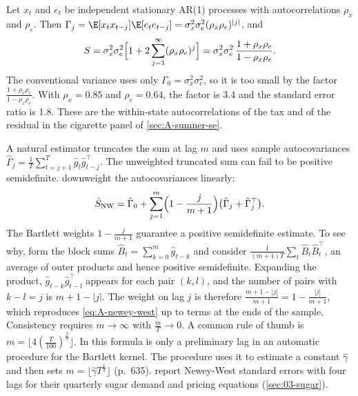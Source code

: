 \begin{example}\label{ex:A-ar1-factor}
Let $x_t$ and $e_t$ be independent stationary AR(1) processes with autocorrelations $\rho_x$ and $\rho_e$. Then
$\Gamma_j = \E[x_tx_{t-j}]\E[e_te_{t-j}] = \sigma_x^2\sigma_e^2(\rho_x\rho_e)^{|j|}$, and
\begin{equation*}
  S = \sigma_x^2\sigma_e^2\Bigl[1 + 2\sum_{j=1}^{\infty}(\rho_x\rho_e)^j\Bigr]
  = \sigma_x^2\sigma_e^2\,\frac{1 + \rho_x\rho_e}{1 - \rho_x\rho_e}.
\end{equation*}
The conventional variance uses only $\Gamma_0 = \sigma_x^2\sigma_e^2$, so it is too small by the factor
$\frac{1 + \rho_x\rho_e}{1 - \rho_x\rho_e}$. With $\rho_x = 0.85$ and $\rho_e = 0.64$, the factor is 3.4 and the
standard error ratio is 1.8. These are the within-state autocorrelations of the tax and of the residual in the
cigarette panel of \cref{sec:A-sumner-se}.
\end{example}

A natural estimator truncates the sum at lag $m$ and uses sample autocovariances
$\hat\Gamma_j = \frac{1}{T}\sum_{t=j+1}^{T}\hat g_t\hat g_{t-j}^\top$. The unweighted truncated sum can fail to be
positive semidefinite. \citet{NeweyWest1987} downweight the autocovariances linearly:
\begin{equation}\label{eq:A-newey-west}
  \hat S_{\text{NW}} = \hat\Gamma_0 + \sum_{j=1}^{m}\Bigl(1 - \frac{j}{m+1}\Bigr)\bigl(\hat\Gamma_j + \hat\Gamma_j^\top\bigr).
\end{equation}
The Bartlett weights $1 - \frac{j}{m+1}$ guarantee a positive semidefinite estimate. To see why, form the block sums
$\hat B_t = \sum_{k=0}^{m}\hat g_{t-k}$ and consider $\frac{1}{(m+1)T}\sum_t\hat B_t\hat B_t^\top$, an average of
outer products and hence positive semidefinite. Expanding the product, $\hat g_{t-k}\hat g_{t-l}^\top$ appears for
each pair $(k, l)$, and the number of pairs with $k - l = j$ is $m + 1 - |j|$. The weight on lag $j$ is therefore
$\frac{m + 1 - |j|}{m+1} = 1 - \frac{|j|}{m+1}$, which reproduces \eqref{eq:A-newey-west} up to terms at the ends
of the sample. Consistency requires $m \to \infty$ with $\frac{m}{T} \to 0$. A common rule of thumb is $m =
\lfloor 4(\frac{T}{100})^{\frac{2}{9}}\rfloor$. In \citet[p.~634]{NeweyWest1994} this formula is only a preliminary
lag in an automatic procedure for the Bartlett kernel. The procedure uses it to estimate a constant $\hat\gamma$ and then
sets $m = \lfloor\hat\gamma T^{\frac{1}{3}}\rfloor$ (p.~635).
\citet{GenesoveMullin1998} report Newey-West standard errors with four lags for their quarterly sugar demand and
pricing equations (\cref{sec:03-sugar}).

